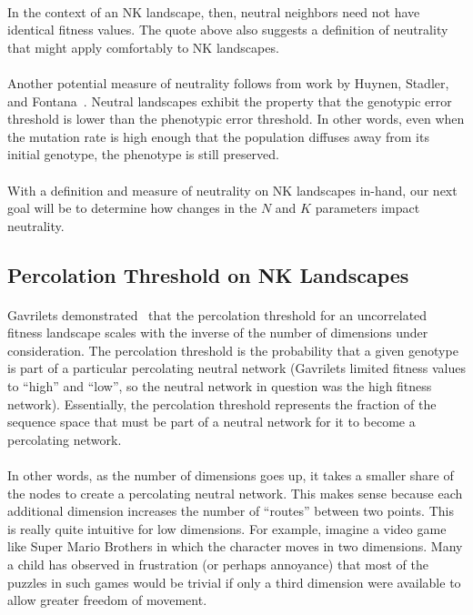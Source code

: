 \documentclass[12pt,letterpaper,titlepage]{article}
\begin{document}
\paragraph{}
In the context of an NK landscape, then, neutral neighbors need not have
identical fitness values. The quote above also suggests a definition of
neutrality that might apply comfortably to NK landscapes.

\paragraph{}
Another potential measure of neutrality follows from work by Huynen, Stadler,
and Fontana~\cite{Huynen1996a}. Neutral landscapes exhibit the property that
the genotypic error threshold is lower than the phenotypic error threshold. In
other words, even when the mutation rate is high enough that the population
diffuses away from its initial genotype, the phenotype is still preserved.

\paragraph{}
With a definition and measure of neutrality on NK landscapes in-hand, our next
goal will be to determine how changes in the $N$ and $K$ parameters impact
neutrality.

\subsection{Percolation Threshold on NK Landscapes}

\paragraph{}
Gavrilets demonstrated~\cite{Gavrilets1997} that the percolation threshold for
an uncorrelated fitness landscape scales with the inverse of the number of
dimensions under consideration. The percolation threshold is the probability
that a given genotype is part of a particular percolating neutral network
(Gavrilets limited fitness values to ``high'' and ``low'', so the neutral
network in question was the high fitness network). Essentially, the percolation
threshold represents the fraction of the sequence space that must be part of a
neutral network for it to become a percolating network.

\paragraph{}
In other words, as the number of dimensions goes up, it takes a smaller share
of the nodes to create a percolating neutral network. This makes sense because
each additional dimension increases the number of ``routes'' between two
points. This is really quite intuitive for low dimensions. For example, imagine
a video game like Super Mario Brothers in which the character moves in two
dimensions. Many a child has observed in frustration (or perhaps annoyance)
that most of the puzzles in such games would be trivial if only a third
dimension were available to allow greater freedom of movement.
\end{document}
